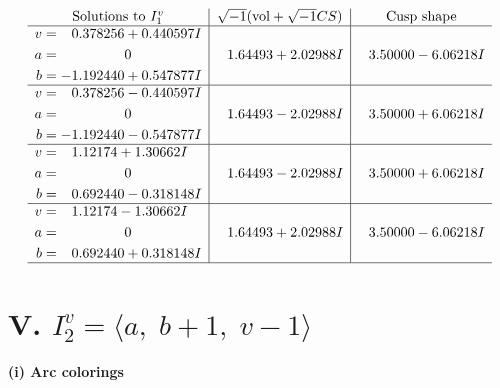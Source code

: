 \documentclass[1p]{elsarticle_modified}
\theoremstyle{definition}
\newcommand{\I}{\sqrt{-1}}
\begin{document}
$$\begin{array}{c|c|c}  
\text{Solutions to }I^v_{1}& \I (\text{vol} + \sqrt{-1}CS) & \text{Cusp shape}\\
 \hline 
\begin{aligned}
v &= \phantom{-}0.378256 + 0.440597 I \\
a &= \phantom{-0.000000 } 0 \\
b &= -1.192440 + 0.547877 I\end{aligned}
 & \phantom{-}1.64493 + 2.02988 I & \phantom{-}3.50000 - 6.06218 I \\ \hline\begin{aligned}
v &= \phantom{-}0.378256 - 0.440597 I \\
a &= \phantom{-0.000000 } 0 \\
b &= -1.192440 - 0.547877 I\end{aligned}
 & \phantom{-}1.64493 - 2.02988 I & \phantom{-}3.50000 + 6.06218 I \\ \hline\begin{aligned}
v &= \phantom{-}1.12174 + 1.30662 I \\
a &= \phantom{-0.000000 } 0 \\
b &= \phantom{-}0.692440 - 0.318148 I\end{aligned}
 & \phantom{-}1.64493 - 2.02988 I & \phantom{-}3.50000 + 6.06218 I \\ \hline\begin{aligned}
v &= \phantom{-}1.12174 - 1.30662 I \\
a &= \phantom{-0.000000 } 0 \\
b &= \phantom{-}0.692440 + 0.318148 I\end{aligned}
 & \phantom{-}1.64493 + 2.02988 I & \phantom{-}3.50000 - 6.06218 I\\
 \hline 
 \end{array}$$\newpage\newpage\renewcommand{\arraystretch}{1}
\centering \section*{V. $I^v_{2}= \langle a,\;b+1,\;v-1 \rangle$}
\flushleft \textbf{(i) Arc colorings}\\
\end{document}
